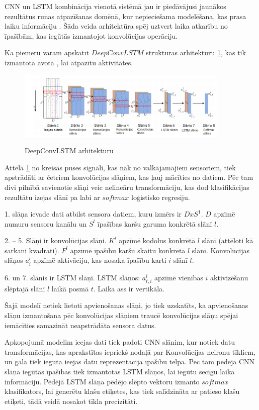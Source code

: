 \documentclass[12pt,paper=A4]{report}
\begin{document}
 CNN un LSTM kombinācija vienotā sistēmā jau ir piedāvājusi jaunākos rezultātus runas atpazīšanas domēnā, kur nepieciešama modelēšana, kas prasa laiku informāciju \cite{article}. Šāda veida arhitektūra spēj uztvert laika atkarību no īpašībām, kas iegūtās izmantojot konvolūcijas operāciju. 
 
Kā piemēru varam apskatīt $DeepConvLSTM$ struktūras arhitektūru  \ref{deepCnnLstm}, kas tik izmantota avotā \cite{https://www.mdpi.com/1424-8220/16/1/115}, lai atpazītu aktivitātes.

\begin{figure}[H] \centering
\includegraphics[width=0.90\textwidth]{sigDeepLSTm} \caption{DeepConvLSTM arhitektūru} \cite{https://www.mdpi.com/1424-8220/16/1/115}  \label{deepCnnLstm} 
\end{figure}


 Attēlā \ref{deepCnnLstm} no kreisās puses signāli, kas nāk no valkājamajiem sensoriem, tiek apstrādāti ar četriem konvolūcijas slāņiem, kas ļauj mācīties no datiem. Pēc tam divi pilnībā savienotie slāņi veic nelineāru transformāciju, kas dod klasifikācijas rezultātu izejas slānī pa labi ar $softmax$ loģistisko regresiju. 

1. slāņa ievade dati  atbilst sensora datiem, kuru izmērs ir $D x S^1$. $D$ apzīmē numuru sensoru kanālu un $S^l$ īpašības karšu garuma konkrētā slānī $l$. 

2. – 5. Slāņi ir konvolūcijas slāņi. $K^l$ apzīmē kodolus konkrētā $l$ slānī (attēloti kā sarkani kvadrāti). $F^l$ apzīmē īpašību karšu skaitu konkrētā $l$ slānī. Konvolūcijas slāņos $a^l_i$ apzīmē aktivāciju, kas nosaka īpašību karti $i$ slānī $l$.
 
  6. un 7. slānis ir LSTM slāņi. LSTM slāņos: $a^l_{t,i}$ apzīmē vienības $i$ aktivizēšanu slēptajā slānī $l$ laikā posmā $t$. Laika ass ir vertikāla. 

Šajā modelī netiek lietoti apvienošanas slāņi, jo tiek uzskatīts, ka apvienošanas slāņu izmantošana pēc konvolūcijas slāņiem traucē konvolūcijas slāņu spējai iemācīties samazināt neapstrādāta sensora datus. 
 
Apkopojumā modelim ieejas dati tiek padoti CNN slānim, kur notiek datu transformācijas, kas aprakstītas iepriekš nodaļā par Konvolūcijas neironu tīkliem, un galā tiek iegūta ieejas datu reprezentācija īpašību telpā. Pēc tam pēdējā CNN slāņa iegūtās īpašības tiek izmantotas LSTM slāņos, lai iegūtu secīgu laika informāciju. Pēdējā LSTM slāņa pēdējo slēpto vektoru izmanto $softmax$ klasifikators, lai ģenerētu klašu etiķetes, kas tiek salīdzināta ar patieso klašu etiķeti, tādā veidā nosakot tīkla precizitāti. 
\end{document}
